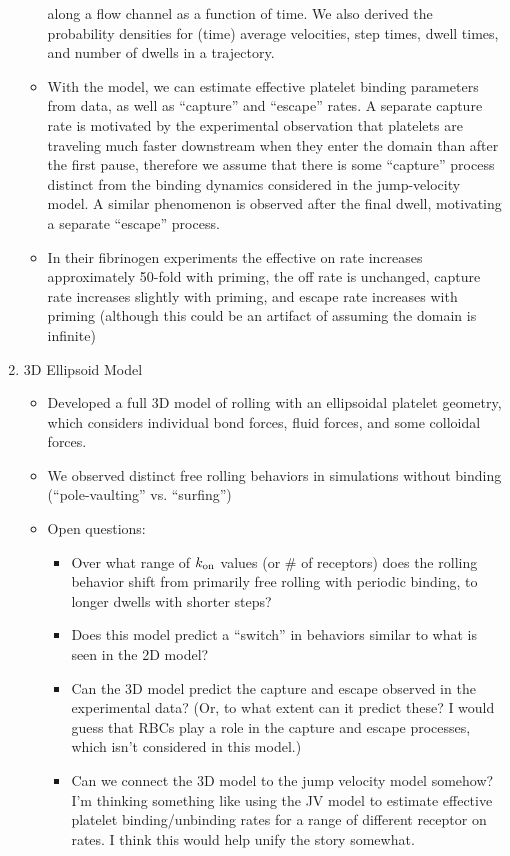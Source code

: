 \documentclass{article}
\newcommand{\tn}{\textnormal}
\begin{document}
\begin{enumerate}
\begin{itemize}
    along a flow channel as a function of time. We also derived the
    probability densities for (time) average velocities, step times,
    dwell times, and number of dwells in a trajectory.
  \item With the model, we can estimate effective platelet binding
    parameters from data, as well as ``capture'' and ``escape''
    rates. A separate capture rate is motivated by the experimental
    observation that platelets are traveling much faster downstream
    when they enter the domain than after the first pause, therefore
    we assume that there is some ``capture'' process distinct from the
    binding dynamics considered in the jump-velocity model. A similar
    phenomenon is observed after the final dwell, motivating a
    separate ``escape'' process.
  \item In their fibrinogen experiments the effective on rate
    increases approximately 50-fold with priming, the off rate is
    unchanged, capture rate increases slightly with priming, and
    escape rate increases with priming (although this could be an
    artifact of assuming the domain is infinite)
  \end{itemize}
\item 3D Ellipsoid Model
  \begin{itemize}
  \item Developed a full 3D model of rolling with an ellipsoidal
    platelet geometry, which considers individual bond forces, fluid
    forces, and some colloidal forces.
  \item We observed distinct free rolling behaviors in simulations
    without binding (``pole-vaulting'' vs. ``surfing'')
  \item Open questions:
    \begin{itemize}
    \item Over what range of $k_\tn{on}$ values (or \# of receptors)
      does the rolling behavior shift from primarily free rolling with
      periodic binding, to longer dwells with shorter steps?
    \item Does this model predict a ``switch'' in behaviors similar to
      what is seen in the 2D model?
    \item Can the 3D model predict the capture and escape observed in
      the experimental data? (Or, to what extent can it predict these?
      I would guess that RBCs play a role in the capture and escape
      processes, which isn't considered in this model.)
    \item Can we connect the 3D model to the jump velocity model
      somehow? I'm thinking something like using the JV model to
      estimate effective platelet binding/unbinding rates for a range
      of different receptor on rates. I think this would help unify
      the story somewhat.
    \end{itemize}
  \end{itemize}
\end{enumerate}
\end{document}
